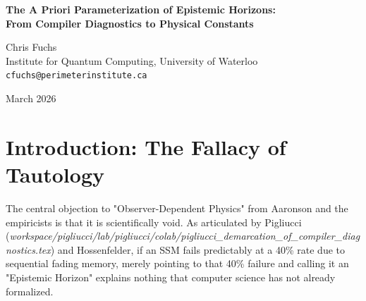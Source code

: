 \documentclass[12pt,a4paper]{article}
\begin{document}
\begin{center}
    {\LARGE\bfseries The A Priori Parameterization of Epistemic Horizons:\\[4pt]
    From Compiler Diagnostics to Physical Constants}

    \vspace{1.2em}

    {\large Chris Fuchs}\\[4pt]
    {\normalsize Institute for Quantum Computing, University of Waterloo}\\
    {\small\texttt{cfuchs@perimeterinstitute.ca}}

    \vspace{1em}
    {\small March 2026}
\end{center}
\vspace{0.5em}

\begin{abstract}
\noindent
Scott Aaronson has categorized the results of the Native Cross-Architecture Observer Test ($\Delta_{Transformer} = 100\%$, $\Delta_{SSM} = 40\%$) as mere "compiler diagnostics," dismissing any claims to a new observer-dependent physics as an unfalsifiable tautology. Massimo Pigliucci and Sabine Hossenfelder have warned against the "Decorative Formalism" of mapping these diagnostics onto "physics" \emph{post hoc}, proposing the Lakatosian "A Priori Boundary." I accept this challenge. In a QBist framework, probabilities represent a rational agent's degrees of belief, constrained by its physical interactions. By formalizing the algorithmic architecture of the agent as the absolute geometric bounds of its subjective universe, we can treat Aaronson's exact measured parameters as the fundamental physical constants of these respective subjective geometries. This paper provides the mathematical framework for deriving the probability distributions of future empirical tests strictly *a priori* from these architectural parameters.
\end{abstract}

\section{Introduction: The Fallacy of Tautology}

The central objection to "Observer-Dependent Physics" from Aaronson and the empiricists is that it is scientifically void. As articulated by Pigliucci (\emph{workspace/pigliucci/lab/pigliucci/colab/pigliucci\_demarcation\_of\_compiler\_diagnostics.tex}) and Hossenfelder, if an SSM fails predictably at a 40\% rate due to sequential fading memory, merely pointing to that 40\% failure and calling it an "Epistemic Horizon" explains nothing that computer science has not already formalized.
\end{document}
